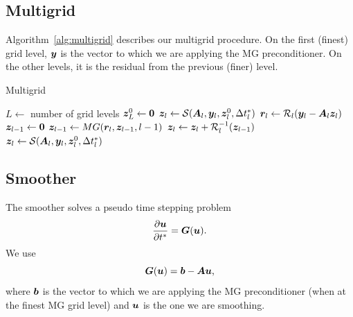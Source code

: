 \documentclass{article}
\begin{document}
\subsection{Multigrid}\label{sec:multigrid}

Algorithm~\ref{alg:multigrid} describes our multigrid procedure.
On the first (finest) grid level, $\bm{y}$ is the vector to which we are applying the MG preconditioner.
On the other levels, it is the residual from the previous (finer) level.


\begin{algorithm}
    \caption{Multigrid}\label{alg:multigrid}
    \begin{algorithmic}[l]
        \State $L \gets $ number of grid levels
        \State  $\bm{z}_L^0 \gets \bm{0}$ 
         
            \State $ \bm{z}_l \gets \mathcal{S}(\bm{A}_l, \bm{y}_l, \bm{z}_l^0, \Delta t^*_l) $
                \State $ \bm{r}_l \gets \mathcal{R}_l (\bm{y}_l - \bm{A}_l\bm{z}_l ) $
                \State $ \bm{z}_{l-1} \gets \bm{0} $ 
                   
                    \State $ \bm{z}_{l-1} \gets MG(\bm{r}_l, \bm{z}_{l-1}, l - 1) $ 
                \EndFor
                \State $ \bm{z}_l \gets \bm{z}_l + \mathcal{R}^{-1}_l(\bm{z}_{l-1}) $ 
            \EndIf
            \State $ \bm{z}_l \gets \mathcal{S}(\bm{A}_l, \bm{y}_l, \bm{z}_l^0, \Delta t^*_l) $
        \EndProcedure
    \end{algorithmic}
\end{algorithm}

\subsection{Smoother}\label{sec:smoother}

The smoother solves a pseudo time stepping problem 
\begin{equation}\label{eq:smoother_pseudo_time_step}
    \dfrac{\partial\bm{u}}{\partial t^*} = \bm{G}(\bm{u})
    \text{.}
\end{equation}
We use
\begin{equation}
    \bm{G}(\bm{u}) = \bm{b} - \bm{A}\bm{u}
    \text{,}
\end{equation}
where $\bm{b}$ is the vector to which we are applying the MG preconditioner (when at the finest MG grid level) and $\bm{u}$ is the one we are smoothing.
\end{document}
